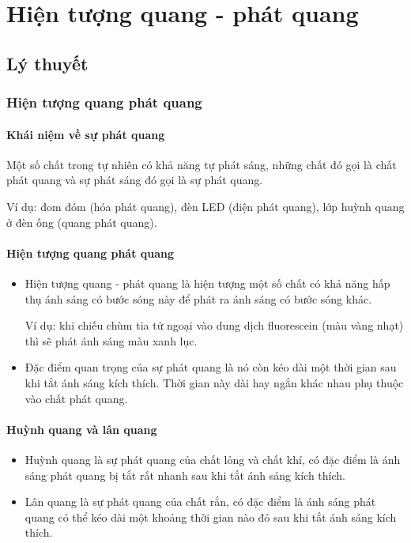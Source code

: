 
\chapter[Hiện tượng quang - phát quang]{Hiện tượng quang - phát quang}
\section{Lý thuyết}
\subsection{Hiện tượng quang phát quang}
\subsubsection{Khái niệm về sự phát quang}
Một số chất trong tự nhiên có khả năng tự phát sáng, những chất đó gọi là chất phát quang và sự phát sáng đó gọi là sự phát quang.

Ví dụ: đom đóm (hóa phát quang), đèn LED (điện phát quang), lớp huỳnh quang ở đèn ống (quang phát quang).
\subsubsection{Hiện tượng quang phát quang}
\begin{itemize}
	\item Hiện tượng quang - phát quang là hiện tượng một số chất có khả năng hấp thụ ánh sáng có bước sóng này để phát ra ánh sáng có bước sóng khác.
	
	Ví dụ: khi chiếu chùm tia tử ngoại vào dung dịch fluorescein (màu vàng nhạt) thì sẽ phát ánh sáng màu xanh lục.
	\item Đặc điểm quan trọng của sự phát quang là nó còn kéo dài một thời gian sau khi tắt ánh sáng kích thích. Thời gian này dài hay ngắn khác nhau phụ thuộc vào chất phát quang.
\end{itemize}
\subsubsection{Huỳnh quang và lân quang}
\begin{itemize}
	\item Huỳnh quang là sự phát quang của chất lỏng và chất khí, có đặc điểm là ánh sáng phát quang bị tắt rất nhanh sau khi tắt ánh sáng kích thích.
	\item Lân quang là sự phát quang của chất rắn, có đặc điểm là ánh sáng phát quang có thể kéo dài một khoảng thời gian nào đó sau khi tắt ánh sáng kích thích.
\end{itemize}
